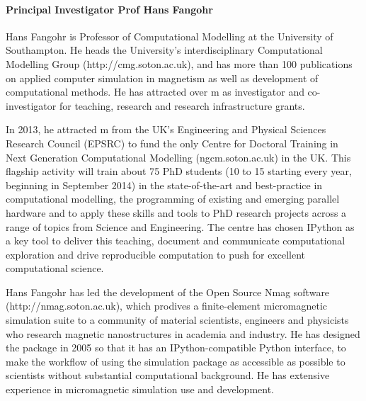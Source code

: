 \paragraph{Principal Investigator Prof Hans Fangohr} Hans Fangohr is Professor of Computational Modelling at the University of Southampton. He heads the University's interdisciplinary Computational Modelling Group (http://cmg.soton.ac.uk), and has more than 100 publications on applied computer simulation in magnetism as well as development of computational methods. He has attracted over m as investigator and co-investigator for teaching, research and research infrastructure grants.

In 2013, he attracted m from the UK's Engineering and Physical
Sciences Research Council (EPSRC) to fund the only Centre for Doctoral
Training in Next Generation Computational Modelling (ngcm.soton.ac.uk)
in the UK. This flagship activity will train about 75 PhD students (10
to 15 starting every year, beginning in September 2014) in the
state-of-the-art and best-practice in computational modelling, the
programming of existing and emerging parallel hardware and to apply
these skills and tools to PhD research projects across a range of
topics from Science and Engineering. The centre has chosen IPython as
a key tool to deliver this teaching, document and communicate
computational exploration and drive reproducible computation to push
for excellent computational science.

Hans Fangohr has led the development of the Open Source Nmag software
(http://nmag.soton.ac.uk), which prodives a finite-element
micromagnetic simulation suite to a community of material scientists,
engineers and physicists who research magnetic nanostructures in
academia and industry. He has designed the package in 2005 so
that it has an IPython-compatible Python interface, to make the
workflow of using the simulation package as accessible as possible to
scientists without substantial computational background. He has
extensive experience in micromagnetic simulation use and development.


